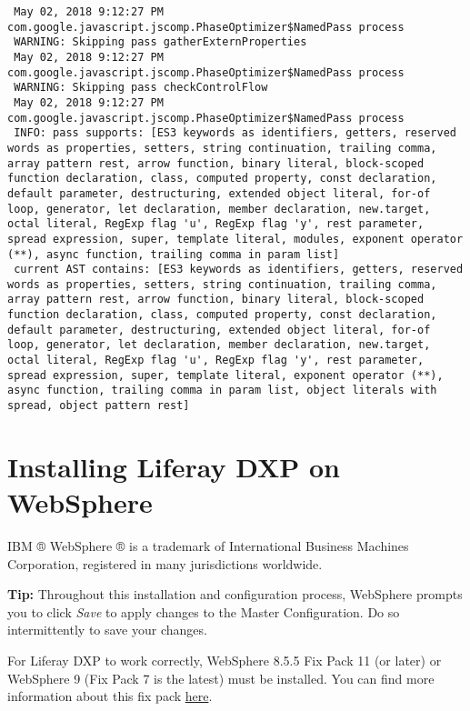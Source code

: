 \begin{verbatim}
 May 02, 2018 9:12:27 PM com.google.javascript.jscomp.PhaseOptimizer$NamedPass process
 WARNING: Skipping pass gatherExternProperties
 May 02, 2018 9:12:27 PM com.google.javascript.jscomp.PhaseOptimizer$NamedPass process
 WARNING: Skipping pass checkControlFlow
 May 02, 2018 9:12:27 PM com.google.javascript.jscomp.PhaseOptimizer$NamedPass process
 INFO: pass supports: [ES3 keywords as identifiers, getters, reserved words as properties, setters, string continuation, trailing comma, array pattern rest, arrow function, binary literal, block-scoped function declaration, class, computed property, const declaration, default parameter, destructuring, extended object literal, for-of loop, generator, let declaration, member declaration, new.target, octal literal, RegExp flag 'u', RegExp flag 'y', rest parameter, spread expression, super, template literal, modules, exponent operator (**), async function, trailing comma in param list]
 current AST contains: [ES3 keywords as identifiers, getters, reserved words as properties, setters, string continuation, trailing comma, array pattern rest, arrow function, binary literal, block-scoped function declaration, class, computed property, const declaration, default parameter, destructuring, extended object literal, for-of loop, generator, let declaration, member declaration, new.target, octal literal, RegExp flag 'u', RegExp flag 'y', rest parameter, spread expression, super, template literal, exponent operator (**), async function, trailing comma in param list, object literals with spread, object pattern rest]
\end{verbatim}

\section{Installing Liferay DXP on
WebSphere}\label{installing-liferay-dxp-on-websphere}

IBM ® WebSphere ® is a trademark of International Business Machines
Corporation, registered in many jurisdictions worldwide.

\noindent\hrulefill

\textbf{Tip:} Throughout this installation and configuration process,
WebSphere prompts you to click \emph{Save} to apply changes to the
Master Configuration. Do so intermittently to save your changes.

\noindent\hrulefill

For Liferay DXP to work correctly, WebSphere 8.5.5 Fix Pack 11 (or
later) or WebSphere 9 (Fix Pack 7 is the latest) must be installed. You
can find more information about this fix pack
\href{http://www-01.ibm.com/support/docview.wss?uid=swg24043005}{here}.

